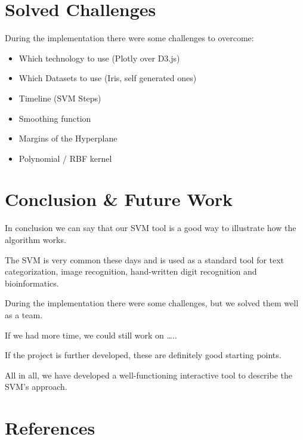 \documentclass{scrartcl}
\begin{document}





\section{Solved Challenges}

During the implementation there were some challenges to overcome:

\begin{itemize}
	\item Which technology to use (Plotly over D3.js)
	\item Which Datasets to use (Iris, self generated ones)
	\item Timeline (SVM Steps) 
	\item Smoothing function
	\item Margins of the Hyperplane
	\item Polynomial / RBF kernel 
\end{itemize}




\section{Conclusion \& Future Work}
In conclusion we can say that our SVM tool is a good way to illustrate how the algorithm works. 

The SVM is very common these days and is used as a standard tool for text categorization, image recognition, hand-written digit recognition and bioinformatics. 

During the implementation there were some challenges, but we solved them well as a team.

If we had more time, we could still work on ….. 

If the project is further developed, these are definitely good starting points. 

All in all, we have developed a well-functioning interactive tool to describe the SVM's approach. 

\section{References}
\end{document}
